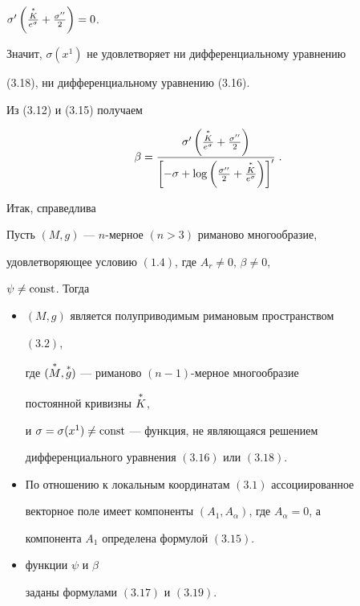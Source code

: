 $\sigma'\left(\frac{\overset{*}{K}{}}{e^\sigma}+\frac{\sigma''}{2}\right)=0$. 


Значит, $\sigma(x^1)$ не удовлетворяет ни дифференциальному уравнению 


(3.18), ни дифференциальному уравнению (3.16). 


 


Из (3.12) и (3.15) получаем 


\begin{equation} 


\beta=\frac{\sigma'\left(\frac{\up{K}}{e^\sigma}+ 


\frac{\sigma''}{2}\right)} 


{\left[-\sigma+\log\left(\frac{\sigma''}{2}+ 


\frac{\up{K}}{e^\sigma}\right)\right]'}\;. 


\end{equation} 


Итак, справедлива 


 


\begin{thms} 


Пусть $(M,g)$ --- $n$-мерное $(n>3)$ риманово многообразие, 


удовлетворяющее условию $(1.4)$, где $A_r\ne 0$, $\beta\ne 0$, 


$\psi\ne\operatorname{const}$. Тогда 


\begin{itemize} 


\item[(a)] $(M,g)$ является полуприводимым римановым пространством 


$(3.2)$, 


где $(\overset{*}{M}{},\overset{*}{g}{})$ --- риманово $(n-1)$-мерное многообразие 


постоянной кривизны $\overset{*}{K}{}$, 


и $\sigma=\sigma(x^1)\ne\operatorname{const}$ --- функция, не являющаяся решением 


дифференциального уравнения $(3.16)$ или $(3.18)$. 


\item[(б)] По отношению к локальным координатам $(3.1)$ ассоциированное 


векторное поле имеет компоненты $(A_1,A_\alpha)$, где $A_\alpha=0$, а 


компонента $A_1$ определена формулой $(3.15)$. 


\item[(в)] функции $\psi$ и $\beta$ 


заданы формулами $(3.17)$ и $(3.19)$.


\end{itemize} 


\end{thms} 


